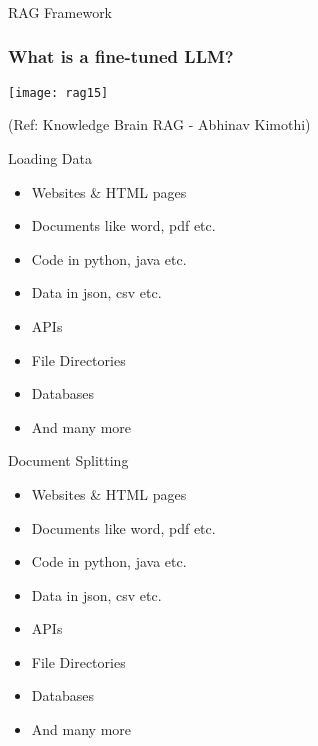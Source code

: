 \begin{frame}[fragile]\frametitle{}
\begin{center}
{\Large RAG Framework}
\end{center}
\end{frame}

\begin{frame}[fragile]\frametitle{What is a fine-tuned LLM?}


		\begin{center}
		\texttt{[image: rag15]}
		\end{center}

{\tiny (Ref: Knowledge Brain RAG - Abhinav  Kimothi)}

\end{frame}

\begin{frame}[fragile]{Loading Data}
    \begin{itemize}
        \item Websites \& HTML pages
        \item Documents like word, pdf etc.
        \item Code in python, java etc.
        \item Data in json, csv etc.
        \item APIs
        \item File Directories
        \item Databases
        \item And many more
    \end{itemize}
\end{frame}

\begin{frame}[fragile]{Document Splitting}
    \begin{itemize}
        \item Websites \& HTML pages
        \item Documents like word, pdf etc.
        \item Code in python, java etc.
        \item Data in json, csv etc.
        \item APIs
        \item File Directories
        \item Databases
        \item And many more
    \end{itemize}
\end{frame}


